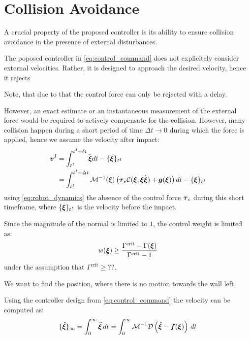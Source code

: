 \section{Collision Avoidance} \label{sec:collision_avoidance}

A crucial property of the proposed controller is its ability to ensure collision avoidance in the presence of external disturbances.

The poposed controller in \eqref{eq:control_command} does not explicitely consider external velocities. Rather, it is designed to approach the desired velocity, hence it rejects 

Note, that due to that the control force can only be rejected with a delay.

However, an exact estimate or an instantaneous measurement of the external force would be required to actively compensate for the collision.
However, many collision happen during a short period of time $\Delta t \rightarrow 0$ during which the force is applied, hence we assume the velocity after impact:
\begin{align}
	\boldsymbol{v}^I 
	 & = \int_{t^I}^{t^I + \delta t} \ddot{\boldsymbol{\xi}} dt - \{ \boldsymbol{\xi} \}_{t^I} \\
	 & = \int_{t^I}^{t^I + \Delta t} \mathcal{M}^{-1}(\boldsymbol{\xi})  \left( \boldsymbol{\tau}_e \mathcal{C}(\boldsymbol{\xi}, \dot{\boldsymbol{\xi}} \dot{\boldsymbol{\xi}}) + \boldsymbol{g}(\boldsymbol{\xi}) \right) dt - \{\boldsymbol{\xi} \}_{t^I} \nonumber
\end{align}
using \eqref{eq:robot_dynamics} the absence of the control force $\boldsymbol{\tau}_c$ during this short timeframe, where $\{\boldsymbol{\xi} \}_{t^I}$ is the velocity before the impact.
 
Since the magnitude of the normal is limited to $1$, the control weight is limited as: 
\begin{equation}
w(\boldsymbol{\xi}) \geq \frac{\Gamma^{\mathrm{crit}} - \Gamma(\boldsymbol{\xi})}{\Gamma^{\mathrm{crit}} - 1}
\end{equation}
under the assumption that $\Gamma^{\mathrm{crit}} \geq ??$.

We want to find the position, where there is no motion towards the wall left.

Using the controller design from \eqref{eq:control_command} the velocity can be computed as:
\begin{equation}
\begin{split}
	\{ \vecs{\dot \xi} \}_\infty & = \int_0^\infty \vecs{\ddot \xi} \, dt 
    = \int_0^\infty \matd{M}^{-1} \matd{D}  \left( \vecs{\dot \xi} - \vecs f(\vecs \xi) \right) \, dt \\
\end{split}
\label{eq:velocity_evolution}
\end{equation}



